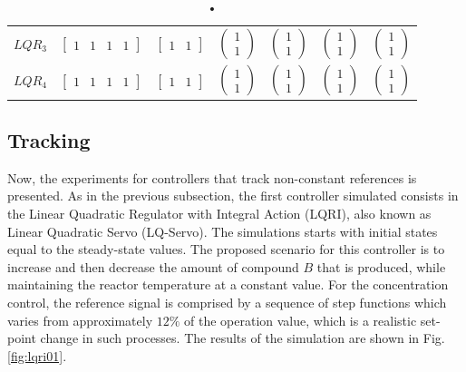\documentclass[a4paper,11pt]{book}
\numberwithin{figure}{chapter}
\numberwithin{equation}{chapter}
\numberwithin{table}{chapter}
\theoremstyle{definition}
\begin{document}
\begin{table}[ht]
\begin{tabular}{l | c c | c c c c}
		$LQR_3$ & $\begin{bmatrix} 1 & 1 & 1 & 1 \end{bmatrix}$ & $\begin{bmatrix} 1 & 1 \end{bmatrix}$ & $\begin{pmatrix} 1 \\ 1 \end{pmatrix}$ & $\begin{pmatrix} 1 \\ 1 \end{pmatrix}$	& $\begin{pmatrix} 1 \\ 1 \end{pmatrix}$ & $\begin{pmatrix} 1 \\ 1 \end{pmatrix}$ \\
		$LQR_4$ & $\begin{bmatrix} 1 & 1 & 1 & 1 \end{bmatrix}$ & $\begin{bmatrix} 1 & 1 \end{bmatrix}$ & $\begin{pmatrix} 1 \\ 1 \end{pmatrix}$ & $\begin{pmatrix} 1 \\ 1 \end{pmatrix}$	& $\begin{pmatrix} 1 \\ 1 \end{pmatrix}$ & $\begin{pmatrix} 1 \\ 1 \end{pmatrix}$ \\
	\end{tabular}
	
	\caption{•}
	\label{tb:lqrMetrics}
\end{table}

\subsection{Tracking}

Now, the experiments for controllers that track non-constant references is presented. As in the previous subsection, the first controller simulated consists in the Linear Quadratic Regulator with Integral Action (LQRI), also known as Linear Quadratic Servo (LQ-Servo). The simulations starts with initial states equal to the steady-state values. The proposed scenario for this controller is to increase and then decrease the amount of compound $B$ that is produced, while maintaining the reactor temperature at a constant value. For the concentration control, the reference signal is comprised by a sequence of step functions which varies from approximately $12\%$ of the operation value, which is a realistic set-point change in such processes. The results of the simulation are shown in Fig. \ref{fig:lqri01}.
\end{document}
